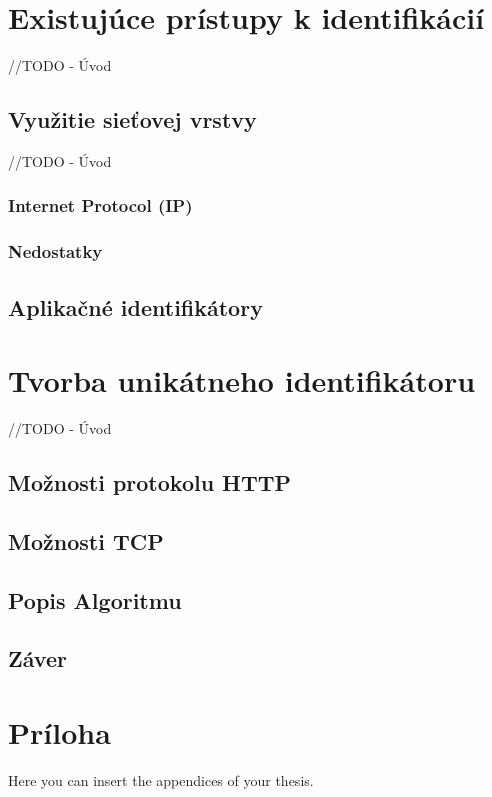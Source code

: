 \documentclass[
  printed, %
  table,   %
  lof,     %
  lot,     %
]{fithesis3}
\begin{document}
\chapter{Existujúce prístupy k identifikácií}
//TODO - Úvod
\section{Využitie sieťovej vrstvy}
//TODO - Úvod
\subsection{Internet Protocol (IP)}
\subsection{Nedostatky}
\section{Aplikačné identifikátory}

\chapter{Tvorba unikátneho identifikátoru}
//TODO - Úvod
\section{Možnosti protokolu HTTP}
\section{Možnosti TCP}
\section{Popis Algoritmu}

\section{Záver}

\makeatletter\thesis@blocks@clear\makeatother
{} %
\printindex

\appendix %
\chapter{Príloha}
Here you can insert the appendices of your thesis.
\end{document}
